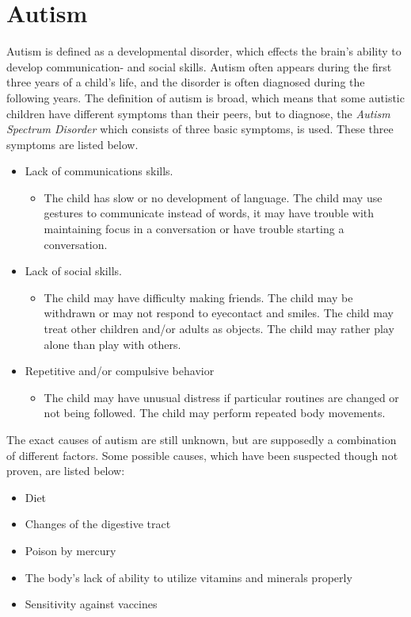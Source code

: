 \section{Autism}
Autism is defined as a developmental disorder, which effects the brain's ability to develop communication- and social skills. Autism often appears during the first three years of a child's life, and the disorder is often diagnosed during the following years.
The definition of autism is broad, which means that some autistic children have different symptoms than their peers, but to diagnose, the \textit{Autism Spectrum Disorder} which consists of three basic symptoms, is used. These three symptoms are listed below.
\begin{itemize}

  \item{Lack of communications skills.}
   \begin{itemize}
     \item{The child has slow or no development of language. The child may use gestures to communicate instead of words, it may have trouble with maintaining focus in a conversation or have trouble starting a conversation.}
   \end{itemize}
   
  \item{Lack of social skills.}
   \begin{itemize}
     \item{The child may have difficulty making friends. The child may be withdrawn or may not respond to eyecontact and smiles. The child may treat other children and/or adults as objects. The child may rather play alone than play with others.}
   \end{itemize}

  \item{Repetitive and/or compulsive behavior}
    \begin{itemize}
      \item{The child may have unusual distress if particular routines are changed or not being followed. The child may perform repeated body movements. \cite{autism}}
    \end{itemize}
  
\end{itemize}

The exact causes of autism are still unknown, but are supposedly a combination of different factors. Some possible causes, which have been suspected though not proven, are listed below:

\begin{itemize}
  
  \item{Diet}
  \item{Changes of the digestive tract}
  \item{Poison by mercury}
  \item{The body's lack of ability to utilize vitamins and minerals properly}
  \item{Sensitivity against vaccines\cite{autism}}
  
\end{itemize}

